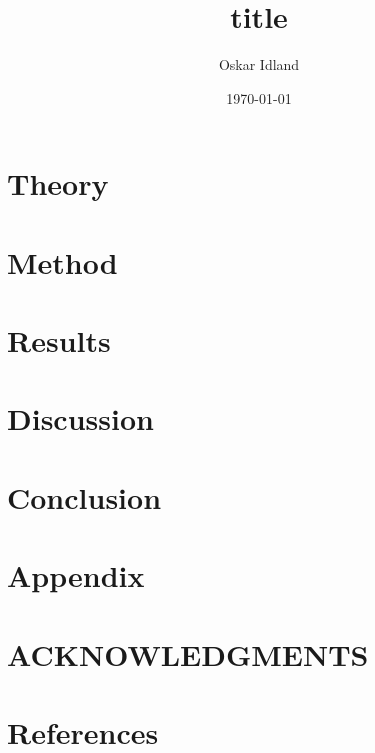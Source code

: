 \documentclass[reprint,english,notitlepage]{revtex4-2}
\begin{document}
\title{title}
\author{Oskar Idland}
\date{\today}

\begin{abstract}
\end{abstract}
\maketitle

\section{Theory} \label{sec: theory}



\section{Method} \label{sec: method}


\section{Results} \label{sec: results}


\section{Discussion} \label{sec: discussion}


\section{Conclusion} \label{sec: conclusion}


\section{Appendix} \label{sec: appendix}

\section*{ACKNOWLEDGMENTS}

\section*{References} \label{sec: references}
\end{document}
